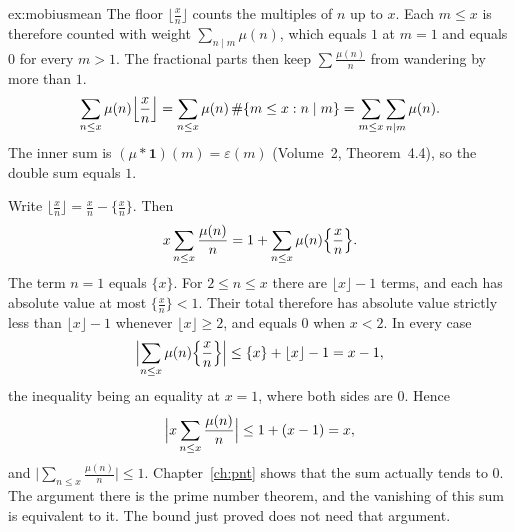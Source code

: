 \begin{solution}{ex:mobiusmean}
\idea The floor $\bigl\lfloor\frac xn\bigr\rfloor$ counts the multiples of $n$ up to $x$. Each $m\le x$ is therefore counted with weight $\sum_{n\mid m}\mu(n)$, which equals $1$ at $m=1$ and equals $0$ for every $m>1$. The fractional parts then keep $\sum\frac{\mu(n)}n$ from wandering by more than $1$.
\writeup
\[
\sum_{n\le x}\mu(n)\Bigl\lfloor\frac xn\Bigr\rfloor=\sum_{n\le x}\mu(n)\,\#\{m\le x:n\mid m\}=\sum_{m\le x}\sum_{n\mid m}\mu(n).
\]
The inner sum is $(\mu*\mathbf 1)(m)=\varepsilon(m)$ (Volume~2, Theorem~4.4), so the double sum equals $1$.

Write $\bigl\lfloor\frac xn\bigr\rfloor=\frac xn-\bigl\{\frac xn\bigr\}$. Then
\[
x\sum_{n\le x}\frac{\mu(n)}n=1+\sum_{n\le x}\mu(n)\Bigl\{\frac xn\Bigr\}.
\]
The term $n=1$ equals $\{x\}$. For $2\le n\le x$ there are $\lfloor x\rfloor-1$ terms, and each has absolute value at most $\bigl\{\frac xn\bigr\}<1$. Their total therefore has absolute value strictly less than $\lfloor x\rfloor-1$ whenever $\lfloor x\rfloor\ge 2$, and equals $0$ when $x<2$. In every case
\[
\Bigl|\sum_{n\le x}\mu(n)\Bigl\{\frac xn\Bigr\}\Bigr|\le\{x\}+\lfloor x\rfloor-1=x-1,
\]
the inequality being an equality at $x=1$, where both sides are $0$. Hence
\[
\Bigl|x\sum_{n\le x}\frac{\mu(n)}n\Bigr|\le 1+(x-1)=x,
\]
and $\bigl|\sum_{n\le x}\frac{\mu(n)}n\bigr|\le 1$. Chapter~\ref{ch:pnt} shows that the sum actually tends to $0$. The argument there is the prime number theorem, and the vanishing of this sum is equivalent to it. The bound just proved does not need that argument.
\end{solution}

